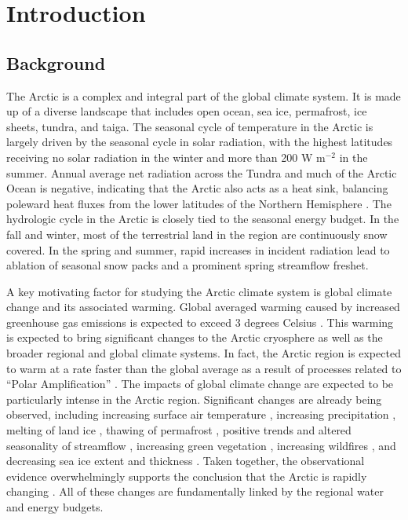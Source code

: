 \chapter{Introduction}
\label{chap:intro}

\section{Background}

The Arctic is a complex and integral part of the global climate system.
It is made up of a diverse landscape that includes open ocean, sea ice, permafrost, ice sheets, tundra, and taiga.
The seasonal cycle of temperature in the Arctic is largely driven by the seasonal cycle in solar radiation, with the highest latitudes receiving no solar radiation in the winter and more than 200 W m$^{-2}$ in the summer.
Annual average net radiation across the Tundra and much of the Arctic Ocean is negative, indicating that the Arctic also acts as a heat sink, balancing poleward heat fluxes from the lower latitudes of the Northern Hemisphere \citep{Serreze_2007}.
The hydrologic cycle in the Arctic is closely tied to the seasonal energy budget.
In the fall and winter, most of the terrestrial land in the region are continuously snow covered.
In the spring and summer, rapid increases in incident radiation lead to ablation of seasonal snow packs and a prominent spring streamflow freshet.

A key motivating factor for studying the Arctic climate system is global climate change and its associated warming.
Global averaged warming caused by increased greenhouse gas emissions is expected to exceed 3 degrees Celsius \citep{IPCC_2014}.
This warming is expected to bring significant changes to the Arctic cryosphere as well as the broader regional and global climate systems.
In fact, the Arctic region is expected to warm at a rate faster than the global average as a result of processes related to ``Polar Amplification'' \citep[e.g.][]{Serreze_2006c,Holland_2003}.
The impacts of global climate change are expected to be particularly intense in the Arctic region.
Significant changes are already being observed, including increasing surface air temperature \citep[e.g.][]{Rigor_2000}, increasing precipitation \citep[e.g.][]{Min_2008}, melting of land ice \citep[e.g.][]{Gardner_2011}, thawing of permafrost \citep[e.g.]{Serreze_2000,Osterkamp_1999}, positive trends and altered seasonality of streamflow \citep[e.g.][]{Dai_2009,McClelland_2006,Peterson_2002,Smith_2007,StJacques_2009}, increasing green vegetation \citep[e.g.][]{Stow_2004,Xu_2013}, increasing wildfires \citep[e.g.][]{Kely_2013}, and decreasing sea ice extent and thickness \citep[e.g.][]{Serreze_2000,Maslowski_2012}.
Taken together, the observational evidence overwhelmingly supports the conclusion that the Arctic is rapidly changing \citep{Serreze_2006b}.
All of these changes are fundamentally linked by the regional water and energy budgets.

